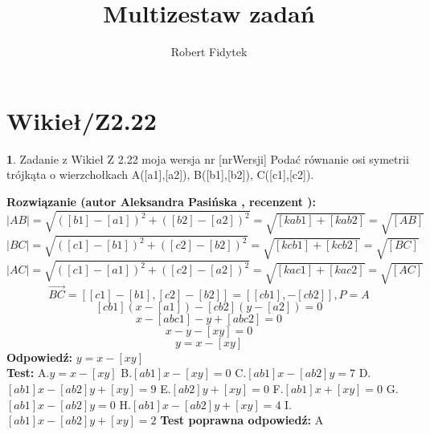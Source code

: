 \documentclass[12pt, a4paper]{article}
\title{Multizestaw zadań}
\author{Robert Fidytek}
\date{}
\theoremstyle{definition} %
\newtheorem{zad}{}
\newcommand{\kategoria}[1]{\section{#1}} %
\newcommand{\zadStart}[1]{\begin{zad}#1\newline} %
\newcommand{\zadStop}{\end{zad}}   %
\newcommand{\rozwStart}[2]{\noindent \textbf{Rozwiązanie (autor #1 , recenzent #2): }\newline} %
\newcommand{\rozwStop}{\newline}                                            %
\newcommand{\odpStart}{\noindent \textbf{Odpowiedź:}\newline}    %
\newcommand{\odpStop}{\newline}                                             %
\newcommand{\testStart}{\noindent \textbf{Test:}\newline} %
\newcommand{\testStop}{\newline} %
\newcommand{\kluczStart}{\noindent \textbf{Test poprawna odpowiedź:}\newline} %
\newcommand{\kluczStop}{\newline} %
\begin{document}
\maketitle


\kategoria{Wikieł/Z2.22}
\zadStart{Zadanie z Wikieł Z 2.22 moja wersja nr [nrWersji]}
Podać równanie osi symetrii trójkąta o wierzchołkach A([a1],[a2]), B([b1],[b2]), C([c1],[c2]).
\zadStop
\rozwStart{Aleksandra Pasińska}{}
$$|AB|=\sqrt{([b1]-[a1])^2+([b2]-[a2])^2}=\sqrt{[kab1]+[kab2]}=\sqrt{[AB]}$$
$$|BC|=\sqrt{([c1]-[b1])^2+([c2]-[b2])^2}=\sqrt{[kcb1]+[kcb2]}=\sqrt{[BC]}$$
$$|AC|=\sqrt{([c1]-[a1])^2+([c2]-[a2])^2}=\sqrt{[kac1]+[kac2]}=\sqrt{[AC]}$$
$$\overrightarrow{BC}=[[c1]-[b1],[c2]-[b2]]=[[cb1],-[cb2]],P=A$$
$$[cb1](x-[a1])-[cb2](y-[a2])=0$$
$$x-[abc1]-y+[abc2]=0$$
$$x-y-[xy]=0$$
$$y=x-[xy]$$
\rozwStop
\odpStart
$y=x-[xy]$\\
\odpStop
\testStart
A.$y=x-[xy]$
B.$[ab1]x-[xy]=0$
C.$[ab1]x-[ab2]y=7$
D.$[ab1]x-[ab2]y+[xy]=9$
E.$[ab2]y+[xy]=0$
F.$[ab1]x+[xy]=0$
G.$[ab1]x-[ab2]y=0$
H.$[ab1]x-[ab2]y+[xy]=4$
I.$[ab1]x-[ab2]y+[xy]=2$
\testStop
\kluczStart
A
\kluczStop
\end{document}
